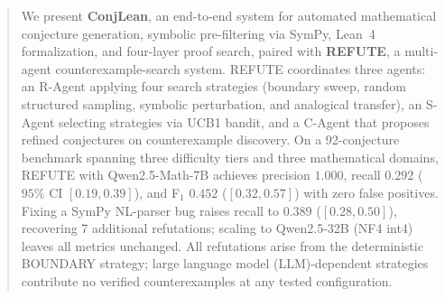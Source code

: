 \documentclass{article}
\begin{document}

\printAffiliationsAndNotice{}

\begin{abstract}
We present \textbf{ConjLean}, an end-to-end system for automated mathematical
conjecture generation, symbolic pre-filtering via SymPy, Lean~4 formalization,
and four-layer proof search, paired with \textbf{REFUTE}, a multi-agent
counterexample-search system.
REFUTE coordinates three agents: an R-Agent applying four search strategies
(boundary sweep, random structured sampling, symbolic perturbation, and
analogical transfer), an S-Agent selecting strategies via UCB1 bandit, and
a C-Agent that proposes refined conjectures on counterexample discovery.
On a 92-conjecture benchmark spanning three difficulty tiers and three
mathematical domains, REFUTE with Qwen2.5-Math-7B achieves precision $1.000$,
recall $0.292$ ($95\%$ CI $[0.19, 0.39]$), and F$_1$ $0.452$ ($[0.32, 0.57]$)
with zero false positives.
Fixing a SymPy NL-parser bug raises recall to $0.389$ ($[0.28, 0.50]$),
recovering 7 additional refutations; scaling to Qwen2.5-32B (NF4 int4) leaves
all metrics unchanged.
All refutations arise from the deterministic BOUNDARY strategy; large language
model (LLM)-dependent strategies contribute no verified counterexamples at any
tested configuration.
\end{abstract}












\end{document}
